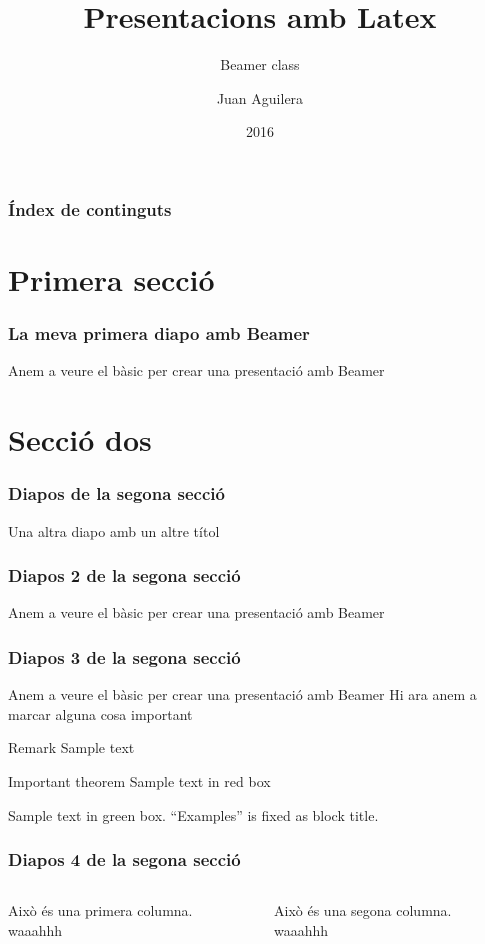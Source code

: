 \documentclass{beamer}
\title[Beamer apunts]{Presentacions amb Latex}
\subtitle{Beamer class}
\author{Juan Aguilera}
\institute[ins jda]{Institut Joan d'Àustria}
\date{2016}
\begin{document}
% 
\frame{\titlepage}

\begin{frame}
 	\frametitle{Índex de continguts}
 	\tableofcontents
\end{frame}

\section{Primera secció}

\begin{frame}
	\frametitle{La meva primera diapo amb Beamer}
	Anem a veure el bàsic per crear una presentació amb Beamer
\end{frame}
 
\section{Secció dos}

\begin{frame}
	\frametitle{Diapos de la segona secció}
	Una altra diapo amb un altre títol
\end{frame}
 
\begin{frame}
	\frametitle{Diapos 2 de la segona secció}
	Anem a veure el bàsic \pause per crear una presentació \pause amb Beamer
\end{frame}

\begin{frame}
	\frametitle{Diapos 3 de la segona secció}
	Anem a veure el bàsic \pause per crear una presentació \pause amb Beamer
	Hi ara anem a marcar alguna \alert{cosa important}

	\begin{block}{Remark}
		Sample text
	\end{block}
	 
	\begin{alertblock}{Important theorem}
		Sample text in red box
	\end{alertblock}
	 
	\begin{examples}
		Sample text in green box. ``Examples'' is fixed as block title.
	\end{examples}

\end{frame}

\begin{frame}
	\frametitle{Diapos 4 de la segona secció}
	\begin{columns}
		\begin{column}{5cm}
		Això \'es una primera columna. \\
		waaahhh
	\end{column}
	\begin{column}{5cm}
		Això \'es una segona columna. \\
		waaahhh
	\end{column}
	\end{columns}
\end{frame}
\end{document}
